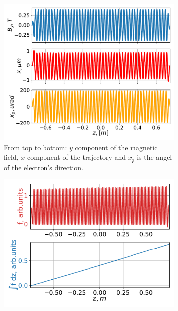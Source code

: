     \begin{figure}[p]
        \centering
        \begin{subfigure}[c]{0.5\linewidth}  %
            \centering
            \includegraphics[width=\linewidth]{content/images/5_THz_Source/und_traj.pdf}
            \caption{From top to bottom: $y$ component of the magnetic field, $x$ component of the trajectory and $x_p$ is the angel of the electron's direction.} %
            \label{Fig:und_traj}
        \end{subfigure}%
        \begin{subfigure}[c]{0.5\linewidth}  %
            \centering
            \includegraphics[width=\linewidth]{content/images/5_THz_Source/und_integral.pdf}

\end{subfigure}
\end{figure}
